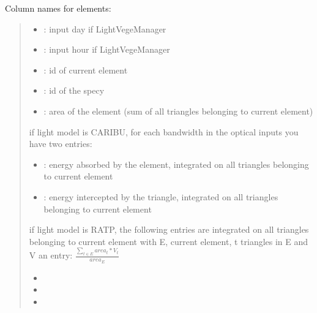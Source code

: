 \documentclass[letterpaper,10pt,english]{sphinxmanual}
\begin{document}
\sphinxAtStartPar
Column names for elements:
\begin{quote}
\begin{itemize}
\item {} 
\sphinxAtStartPar
{}: input day if LightVegeManager

\item {} 
\sphinxAtStartPar
{}: input hour if LightVegeManager

\item {} 
\sphinxAtStartPar
{}: id of current element

\item {} 
\sphinxAtStartPar
{}: id of the specy

\item {} 
\sphinxAtStartPar
{}: area of the element (sum of all triangles belonging to current element)

\end{itemize}

\sphinxAtStartPar
if light model is CARIBU, for each bandwidth in the optical inputs you have two entries:
\begin{itemize}
\item {} 
\sphinxAtStartPar
{}: energy absorbed by the element, integrated on all triangles belonging to current element

\item {} 
\sphinxAtStartPar
{}: energy intercepted by the triangle, integrated on all triangles belonging to current element

\end{itemize}

\sphinxAtStartPar
if light model is RATP, the following entries are integrated on all triangles belonging to current element 
with E, current element, t triangles in E and V an entry: \(\frac{\sum_{t \in E} area_t * V_t}{area_E}\)
\begin{itemize}
\item {} 
\sphinxAtStartPar
{}

\item {} 
\sphinxAtStartPar
{}

\item {} 
\sphinxAtStartPar
{}


\end{itemize}
\end{quote}
\end{document}
